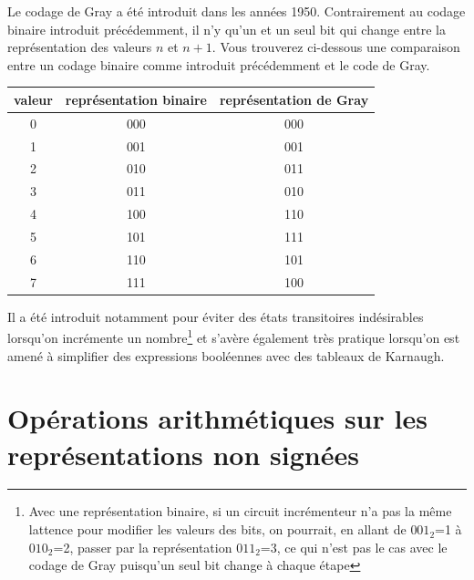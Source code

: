Le codage de Gray a été introduit dans les années 1950. Contrairement au codage binaire introduit précédemment, il n'y qu'un et un seul bit qui change entre la représentation des valeurs $n$ et $n+1$. Vous trouverez ci-dessous une comparaison entre un codage binaire comme introduit précédemment et le code de Gray.

\begin{center}
\begin{tabular}{c|c|c}
valeur & représentation binaire & représentation de Gray\\
\hline
0  & 000 & 000 \\
1  & 001 & 001 \\
2  & 010 & 011 \\
3  & 011 & 010 \\
4  & 100 & 110 \\
5  & 101 & 111 \\
6  & 110 & 101 \\
7  & 111 & 100
\end{tabular}
\end{center}


Il a été introduit notamment pour éviter des états transitoires indésirables lorsqu'on incrémente un nombre\footnote{Avec une représentation binaire, si un circuit incrémenteur n'a pas la même lattence pour modifier les valeurs des bits, on pourrait, en allant de $001_2$=1 à $010_2$=2, passer par la représentation $011_2$=3, ce qui n'est pas le cas avec le codage de Gray puisqu'un seul bit change à chaque étape} et s'avère également très pratique lorsqu'on est amené à simplifier des expressions booléennes avec des tableaux de Karnaugh.


\section{Opérations arithmétiques sur les représentations non signées}

